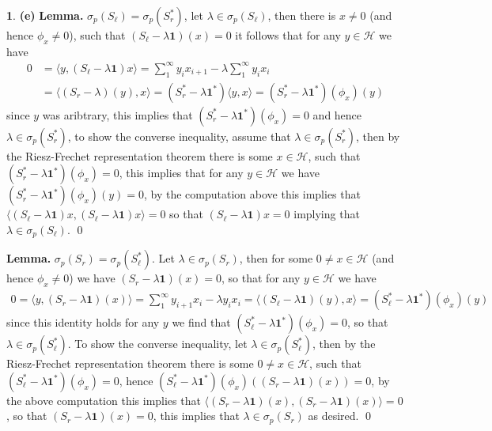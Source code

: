 \documentclass[11pt]{article}
\theoremstyle{definition}
\newtheorem{pb}{}
\newcommand{\gen}[1]{\langle #1 \rangle}
\begin{document}
\begin{pb}
        \textbf{(e)} 
        \textbf{Lemma.} \(\sigma_p(S_\ell) = \sigma_p(S_r^*)\), let \(\lambda \in \sigma_p(S_\ell)\), then there is \(x \neq 0\) (and hence \(\phi_x \neq 0\)), such that \((S_\ell - \lambda\mathbf{1})(x) = 0\) it follows that for any \(y \in \mathcal{H}\) we have
        \begin{align*}
            0 &= \gen{y,(S_\ell - \lambda\mathbf{1})x} = \sum_1^\infty y_ix_{i+1} - \lambda\sum_1^\infty y_ix_i \\ 
            &= \gen{(S_r - \lambda)(y),x} = (S_r^* - \lambda\mathbf{1}^*)\gen{y,x} = (S_r^* - \lambda\mathbf{1}^*)(\phi_x)(y)
        \end{align*}
        since \(y\) was aribtrary, this implies that \((S_r^* - \lambda\mathbf{1}^*)(\phi_x) = 0\) and hence \(\lambda \in \sigma_p(S_r^*)\), to show the converse inequality, assume that \(\lambda \in \sigma_p(S_r^*)\), then by the Riesz-Frechet representation theorem there is some \(x \in \mathcal{H}\), such that \((S_r^* - \lambda\mathbf{1}^*)(\phi_x) = 0\), this implies that for any \(y \in \mathcal{H}\) we have \((S_r^* - \lambda\mathbf{1}^*)(\phi_x)(y) = 0\), by the computation above this implies that \(\gen{(S_\ell - \lambda\mathbf{1})x,(S_\ell - \lambda\mathbf{1})x} = 0\) so that \((S_\ell - \lambda\mathbf{1})x = 0\) implying that \(\lambda \in \sigma_p(S_\ell)\). \qed

        \textbf{Lemma.} \(\sigma_p(S_r) = \sigma_p(S_\ell^*)\). Let \(\lambda \in \sigma_p(S_r)\), then for some \(0 \neq x \in \mathcal{H}\) (and hence \(\phi_x \neq 0\)) we have \((S_r - \lambda\mathbf{1})(x) = 0\), so that for any \(y \in \mathcal{H}\) we have
        \begin{align*}
            0 = \gen{y,(S_r - \lambda\mathbf{1})(x)} = \sum_1^\infty y_{i+1}x_i - \lambda y_ix_i = \gen{(S_\ell - \lambda\mathbf{1})(y),x} = (S_\ell^* - \lambda\mathbf{1}^*)(\phi_x)(y)
        \end{align*}
        since this identity holds for any \(y\) we find that \((S_\ell^* - \lambda\mathbf{1}^*)(\phi_x) = 0\), so that \(\lambda \in \sigma_p(S_\ell^*)\). To show the converse inequality, let \(\lambda \in \sigma_p(S_\ell^*)\), then by the Riesz-Frechet representation theorem there is some \(0 \neq x \in \mathcal{H}\), such that \((S_\ell^* - \lambda\mathbf{1}^*)(\phi_x) = 0\), hence \((S_\ell^* - \lambda\mathbf{1}^*)(\phi_x)((S_r - \lambda\mathbf{1})(x)) = 0\), by the above computation this implies that \(\gen{(S_r - \lambda\mathbf{1})(x),(S_r - \lambda\mathbf{1})(x)} = 0\), so that \((S_r - \lambda\mathbf{1})(x) = 0\), this implies that \(\lambda \in \sigma_p(S_r)\) as desired. \qed
        

\end{pb}
\end{document}
